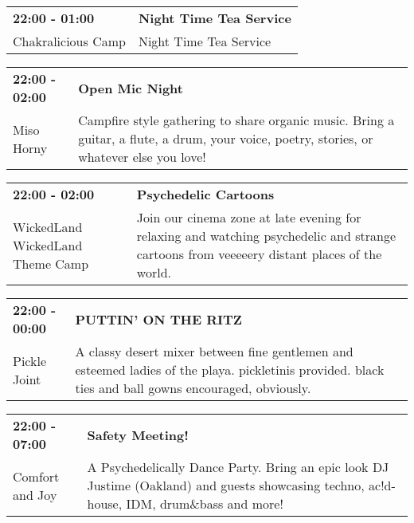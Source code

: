 \begin{tabular}{ p{1in} p{2.2in} }
    \textbf{22:00 - 01:00} & \textbf{Night Time Tea Service} \\
    Chakralicious Camp \newline  & Night Time Tea Service \\
    \hline 
\end{tabular}
    
\begin{tabular}{ p{1in} p{2.2in} }
    \textbf{22:00 - 02:00} & \textbf{Open Mic Night} \\
    Miso Horny \newline  & Campfire style gathering to share organic music. Bring a guitar, a flute, a drum, your voice, poetry, stories, or whatever else you love! \\
    \hline 
\end{tabular}
    
\begin{tabular}{ p{1in} p{2.2in} }
    \textbf{22:00 - 02:00} & \textbf{Psychedelic Cartoons} \\
    WickedLand \newline WickedLand Theme Camp & Join our cinema zone at late evening for relaxing and watching psychedelic and strange cartoons from veeeeery distant places of the world. \\
    \hline 
\end{tabular}
    
\begin{tabular}{ p{1in} p{2.2in} }
    \textbf{22:00 - 00:00} & \textbf{PUTTIN' ON THE RITZ} \\
    Pickle Joint \newline  & A classy desert mixer between fine gentlemen and esteemed ladies of the playa. pickletinis provided. black ties and ball gowns encouraged, obviously. \\
    \hline 
\end{tabular}
    
\begin{tabular}{ p{1in} p{2.2in} }
    \textbf{22:00 - 07:00} & \textbf{Safety Meeting!} \\
    Comfort and Joy \newline  & A Psychedelically Dance Party. Bring an epic look DJ Justime (Oakland) and guests showcasing techno, ac!d-house, IDM, drum\&bass and more! \\
    \hline 
\end{tabular}
    
